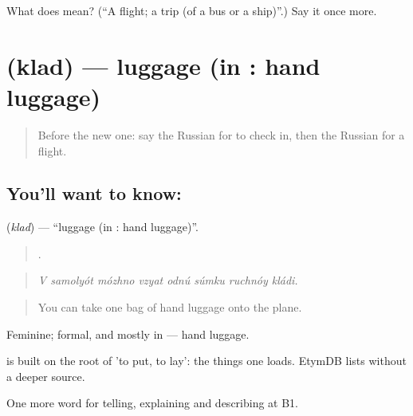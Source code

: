 \begin{tcolorbox}[breakable,colback=teal!4,colframe=teal!35!black,title={Before you move on}]
What does  mean? (\textquotedblleft{}A flight; a trip (of a bus or a ship)\textquotedblright{}.) Say it once more.
\end{tcolorbox}
\section[\texorpdfstring{\ru{кладь} (klad)}{кладь (klad)}]{ (klad) — luggage (in  : hand luggage)}

\label{lesson:RU-C419-kladi}



\begin{quote}
Before the new one: say the Russian for to check in, then the Russian for a flight.
\end{quote}

\subsection*{You'll want to know: }
\textbf{} (\emph{klad}) — \textquotedblleft{}luggage (in  : hand luggage)\textquotedblright{}.

\begin{quote}
       .
\end{quote}

\begin{quote}
\emph{V samolyót mózhno vzyat odnú súmku ruchnóy kládi.}
\end{quote}

\begin{quote}
You can take one bag of hand luggage onto the plane.
\end{quote}

Feminine; formal, and mostly in \emph{ } — hand luggage.

\begin{cousinweb}
\emph{} is built on the root of \emph{} 'to put, to lay': the things one loads. EtymDB lists \emph{} without a deeper source.
\end{cousinweb}

\begin{grammarlens}[title={What you've built}]
One more word for telling, explaining and describing at B1.
\end{grammarlens}

